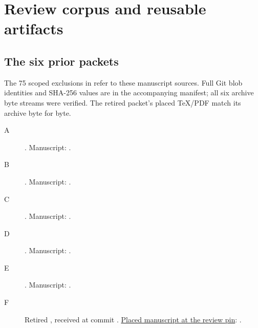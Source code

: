 \section{Review corpus and reusable artifacts}
\label{sec:artifacts}

\subsection{The six prior packets}

The 75 scoped exclusions in 
refer to these manuscript sources. Full Git blob identities and SHA-256
values are in the accompanying manifest; all six archive byte streams were
verified. The retired packet's placed TeX/PDF match its archive byte for byte.

\begin{description}
\item[A] \href{https://github.com/VladimirReshetnikov/ProveIt/blob/b310142330df89e48413c8fce62e7de223e1c7d5/docs/incoming/Lean_Proof_Simplification_2026-10-26.zip}{}.
Manuscript: .
\item[B] \href{https://github.com/VladimirReshetnikov/ProveIt/blob/b310142330df89e48413c8fce62e7de223e1c7d5/docs/incoming/ProveIt_Lean_Proof_Simplification_2026-10-26.zip}{}.
Manuscript: .
\item[C] \href{https://github.com/VladimirReshetnikov/ProveIt/blob/b310142330df89e48413c8fce62e7de223e1c7d5/docs/incoming/diophantine-lean-simplification-2026-10-26.zip}{}.
Manuscript: .
\item[D] \href{https://github.com/VladimirReshetnikov/ProveIt/blob/b310142330df89e48413c8fce62e7de223e1c7d5/docs/incoming/lean-proof-simplification-2026-10-26\%20(2).zip}{}.
Manuscript: .
\item[E] \href{https://github.com/VladimirReshetnikov/ProveIt/blob/b310142330df89e48413c8fce62e7de223e1c7d5/docs/incoming/lean-proof-simplification-2026-10-26.zip}{}.
Manuscript: .
\item[F] Retired ,
received at commit .
\href{https://github.com/VladimirReshetnikov/ProveIt/blob/b310142330df89e48413c8fce62e7de223e1c7d5/Computability/DiophantineConsistency/research/lean-proof-simplification-20261026/report.tex}{Placed manuscript at the review pin}:
.
\end{description}

